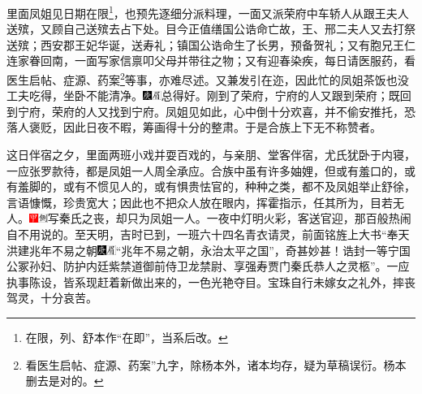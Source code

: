 里面凤姐见日期在限\footnote{在限，列、舒本作“在即”，当系后改。}，也预先逐细分派料理，一面又派荣府中车轿人从跟王夫人送殡，又顾自己送殡去占下处。目今正值缮国公诰命亡故，王、邢二夫人又去打祭送殡；西安郡王妃华诞，送寿礼；镇国公诰命生了长男，预备贺礼；又有胞兄王仁连家眷回南，一面写家信禀叩父母并带往之物；又有迎春染疾，每日请医服药，看医生启帖、症源、药案\footnote{看医生启帖、症源、药案”九字，除杨本外，诸本均存，疑为草稿误衍。杨本删去是对的。}等事，亦难尽述。又兼发引在迩，因此忙的凤姐茶饭也没工夫吃得，坐卧不能清净。{\includegraphics[width=3mm]{../Images/00004}\includegraphics[width=3mm]{../Images/00010}\footnotesize \kaishu 总得好。}刚到了荣府，宁府的人又跟到荣府；既回到宁府，荣府的人又找到宁府。凤姐见如此，心中倒十分欢喜，并不偷安推托，恐落人褒贬，因此日夜不暇，筹画得十分的整肃。于是合族上下无不称赞者。

这日伴宿之夕，里面两班小戏并耍百戏的，与亲朋、堂客伴宿，尤氏犹卧于内寝，一应张罗款待，都是凤姐一人周全承应。合族中虽有许多妯娌，但或有羞口的，或有羞脚的，或有不惯见人的，或有惧贵怯官的，种种之类，都不及凤姐举止舒徐，言语慷慨，珍贵宽大；因此也不把众人放在眼内，挥霍指示，任其所为，目若无人。{\includegraphics[width=3mm]{../Images/00002}\includegraphics[width=3mm]{../Images/00011}\footnotesize \kaishu 写秦氏之丧，却只为凤姐一人。}一夜中灯明火彩，客送官迎，那百般热闹自不用说的。至天明，吉时已到，一班六十四名青衣请灵，前面铭旌上大书“奉天洪建兆年不易之朝{\includegraphics[width=3mm]{../Images/00004}\includegraphics[width=3mm]{../Images/00010}\footnotesize \kaishu “兆年不易之朝，永治太平之国”，奇甚妙甚！}诰封一等宁国公冢孙妇、防护内廷紫禁道御前侍卫龙禁尉、享强寿贾门秦氏恭人之灵柩”。一应执事陈设，皆系现赶着新做出来的，一色光艳夺目。宝珠自行未嫁女之礼外，摔丧驾灵，十分哀苦。

